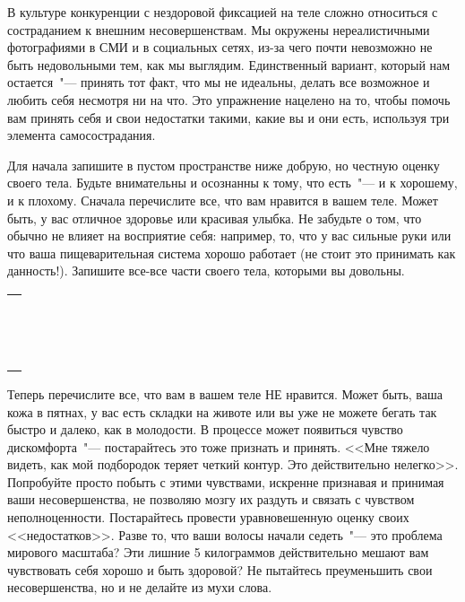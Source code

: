 
В культуре конкуренции с нездоровой фиксацией на теле сложно относиться с состраданием к внешним несовершенствам. Мы окружены нереалистичными фотографиями в СМИ и в социальных сетях, из-за чего почти невозможно не быть недовольными тем, как мы выглядим. Единственный вариант, который нам остается~"--- принять тот факт, что мы не идеальны, делать все возможное и любить себя несмотря ни на что. Это упражнение нацелено на то, чтобы помочь вам принять себя и свои недостатки такими, какие вы и они есть, используя три элемента самосострадания.

\begin{itemize}
	\itemWritingHand Для начала запишите в пустом пространстве ниже добрую, но честную оценку своего тела. Будьте внимательны и осознанны к тому, что есть~"--- и к хорошему, и к плохому. Сначала перечислите все, что вам нравится в вашем теле. Может быть, у вас отличное здоровье или красивая улыбка. Не забудьте о том, что обычно не влияет на восприятие себя: например, то, что у вас сильные руки или что ваша пищеварительная система хорошо работает (не стоит это принимать как данность!). Запишите все-все части своего тела, которыми вы довольны. 
\end{itemize}
\setlength{\extrarowheight}{2mm}
\begin{tabularx}{\textwidth}{X}
	\\
	\arrayrulecolor{gray}\hline\\
	\hline\\
	\hline\\
	\hline\\
	\hline\\
	\hline\\	
	\hline\\
	\hline\\
	\hline\\
	\hline\\
	\hline\\
	\hline\\
	\hline\\
	\hline\\
	\hline\\
\end{tabularx}
\setlength{\extrarowheight}{0mm}
\begin{itemize}
	\itemWritingHand Теперь перечислите все, что вам в вашем теле НЕ нравится. Может быть, ваша кожа в пятнах, у вас есть складки на животе или вы уже не можете бегать так быстро и далеко, как в молодости. В процессе может появиться чувство дискомфорта~"--- постарайтесь это тоже признать и принять. <<Мне тяжело видеть, как мой подбородок теряет четкий контур. Это действительно нелегко>>. Попробуйте просто побыть с этими чувствами, искренне признавая и принимая ваши несовершенства, не позволяю мозгу их раздуть и связать с чувством неполноценности. Постарайтесь провести уравновешенную оценку своих <<недостатков>>. Разве то, что ваши волосы начали седеть~"--- это проблема мирового масштаба? Эти лишние 5 килограммов действительно мешают вам чувствовать себя хорошо и быть здоровой? Не пытайтесь преуменьшить свои несовершенства, но и не делайте из мухи слова. 
\end{itemize}
